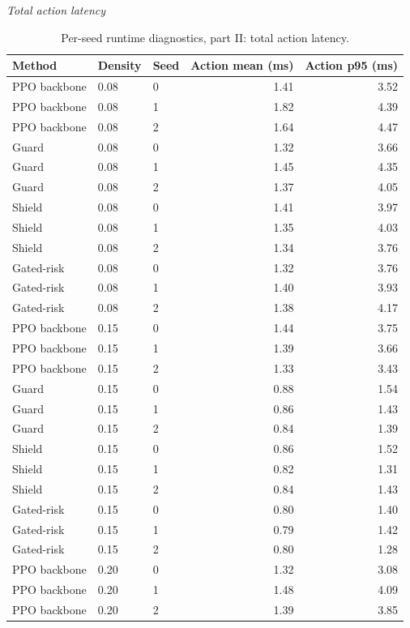 \begin{table}[!htbp]
\centering
\caption{Per-seed runtime diagnostics, part II: total action latency.}
\label{tab_runtime_by_seed_action}
\tiny
\setlength{\tabcolsep}{3.2pt}
\renewcommand{\arraystretch}{1.04}
\textit{Total action latency}\par
\begin{tabular}{@{}lllrr@{}}
\toprule
Method & Density & Seed & Action mean (ms) & Action p95 (ms) \\
\midrule
PPO backbone & 0.08 & 0 & 1.41 & 3.52 \\
PPO backbone & 0.08 & 1 & 1.82 & 4.39 \\
PPO backbone & 0.08 & 2 & 1.64 & 4.47 \\
Guard & 0.08 & 0 & 1.32 & 3.66 \\
Guard & 0.08 & 1 & 1.45 & 4.35 \\
Guard & 0.08 & 2 & 1.37 & 4.05 \\
Shield & 0.08 & 0 & 1.41 & 3.97 \\
Shield & 0.08 & 1 & 1.35 & 4.03 \\
Shield & 0.08 & 2 & 1.34 & 3.76 \\
Gated-risk & 0.08 & 0 & 1.32 & 3.76 \\
Gated-risk & 0.08 & 1 & 1.40 & 3.93 \\
Gated-risk & 0.08 & 2 & 1.38 & 4.17 \\
PPO backbone & 0.15 & 0 & 1.44 & 3.75 \\
PPO backbone & 0.15 & 1 & 1.39 & 3.66 \\
PPO backbone & 0.15 & 2 & 1.33 & 3.43 \\
Guard & 0.15 & 0 & 0.88 & 1.54 \\
Guard & 0.15 & 1 & 0.86 & 1.43 \\
Guard & 0.15 & 2 & 0.84 & 1.39 \\
Shield & 0.15 & 0 & 0.86 & 1.52 \\
Shield & 0.15 & 1 & 0.82 & 1.31 \\
Shield & 0.15 & 2 & 0.84 & 1.43 \\
Gated-risk & 0.15 & 0 & 0.80 & 1.40 \\
Gated-risk & 0.15 & 1 & 0.79 & 1.42 \\
Gated-risk & 0.15 & 2 & 0.80 & 1.28 \\
PPO backbone & 0.20 & 0 & 1.32 & 3.08 \\
PPO backbone & 0.20 & 1 & 1.48 & 4.09 \\
PPO backbone & 0.20 & 2 & 1.39 & 3.85 \\

\end{tabular}
\end{table}

